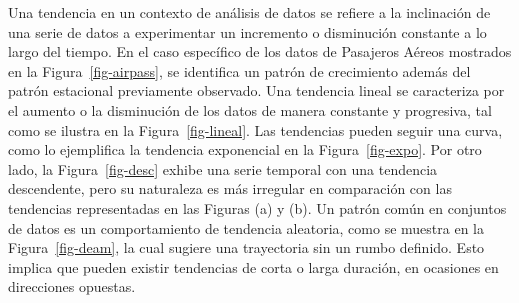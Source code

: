 \documentclass[
  us-letterpaper,
]{scrreprt}
\theoremstyle{plain}
\theoremstyle{definition}
\theoremstyle{plain}
\theoremstyle{definition}
\theoremstyle{remark}
\begin{document}
Una tendencia en un contexto de análisis de datos se refiere a la
inclinación de una serie de datos a experimentar un incremento o
disminución constante a lo largo del tiempo. En el caso específico de
los datos de Pasajeros Aéreos mostrados en la Figura~\ref{fig-airpass},
se identifica un patrón de crecimiento además del patrón estacional
previamente observado. Una tendencia lineal se caracteriza por el
aumento o la disminución de los datos de manera constante y progresiva,
tal como se ilustra en la Figura~\ref{fig-lineal}. Las tendencias pueden
seguir una curva, como lo ejemplifica la tendencia exponencial en la
Figura~\ref{fig-expo}. Por otro lado, la Figura~\ref{fig-desc} exhibe
una serie temporal con una tendencia descendente, pero su naturaleza es
más irregular en comparación con las tendencias representadas en las
Figuras (a) y (b). Un patrón común en conjuntos de datos es un
comportamiento de tendencia aleatoria, como se muestra en la
Figura~\ref{fig-deam}, la cual sugiere una trayectoria sin un rumbo
definido. Esto implica que pueden existir tendencias de corta o larga
duración, en ocasiones en direcciones opuestas.
\end{document}
